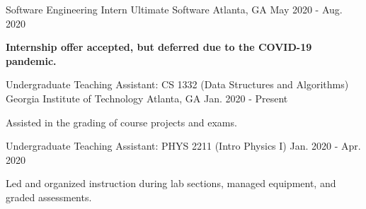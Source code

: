 


\begin{cventries}

\cventry
{Software Engineering Intern}
{Ultimate Software}
{Atlanta, GA}
{May 2020 - Aug. 2020}
{
\begin{cvitems}
\item \textbf{Internship offer accepted, but deferred due to the COVID-19 pandemic.}
\end{cvitems}
}

\cventry
{Undergraduate Teaching Assistant: CS 1332 (Data Structures and Algorithms)} %
{Georgia Institute of Technology} %
{Atlanta, GA} %
{Jan. 2020 - Present} %
{ %
\begin{cvitems}
\item {Assisted in the grading of course projects and exams.}
\end{cvitems}
}

\cventry
{Undergraduate Teaching Assistant: PHYS 2211 (Intro Physics I)} %
{} %
{} %
{Jan. 2020 - Apr. 2020} %
{ %
\begin{cvitems}
\item {Led and organized instruction during lab sections, managed equipment, and graded assessments.}
\end{cvitems}
}


\end{cventries}

